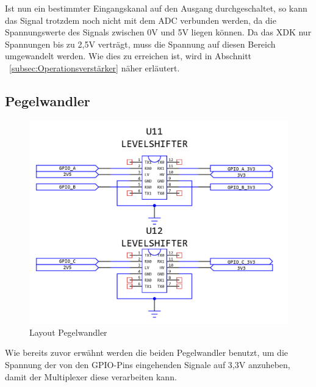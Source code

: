 Ist nun ein bestimmter Eingangskanal auf den Ausgang durchgeschaltet, so kann das Signal trotzdem noch nicht mit dem \acs{ADC} verbunden werden, da die Spannungswerte des Signals zwischen 0V und 5V liegen können. Da das XDK nur Spannungen bis zu 2,5V verträgt, muss die Spannung auf diesen Bereich umgewandelt werden. Wie dies zu erreichen ist, wird in Abschnitt ~\ref{subsec:Operationsverstärker} näher erläutert.
\subsection{Pegelwandler}\label{subsec:Pegelwandler}
\begin{figure}[H]
	\includegraphics[width=\textwidth]{images/Layout_LevelShifter.png}	
	\caption{Layout Pegelwandler}
	\label{fig:Layout_LevelShifter}
\end{figure}
Wie bereits zuvor erwähnt werden die beiden Pegelwandler benutzt, um die Spannung der von den \acs{GPIO}-Pins eingehenden Signale auf 3,3V anzuheben, damit der Multiplexer diese verarbeiten kann.
